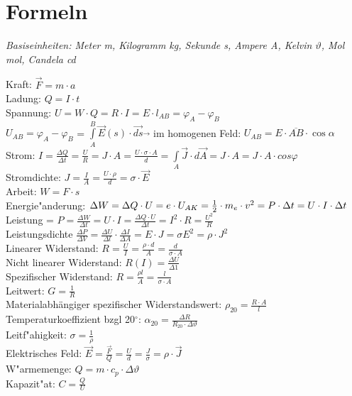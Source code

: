 \section{Formeln}

\textit{Basiseinheiten: Meter m, Kilogramm kg, Sekunde s, Ampere A, Kelvin $\vartheta$, Mol mol, Candela cd} \\
\begin{minipage}{12cm}
	Kraft: $\overrightarrow{F} = m \cdot a$ \\ 
	Ladung: $Q = I \cdot t$\\
	Spannung: $U = W \cdot Q = R \cdot I = E \cdot l_{AB} = \varphi_A - \varphi_B$\\
	$ U_{AB} = \varphi_A - \varphi_B $ = $\int\limits_{A}^B \vec E (s) \cdot  \vec{ds} \overrightarrow{}$ im homogenen Feld: $U_{AB} = E \cdot \overline{AB} \cdot \cos\alpha $ \\
	Strom: $I = \frac{\Delta Q}{\Delta t} = \frac{U}{R} = J \cdot A = \frac{U \cdot \sigma \cdot A}{d} = \int\limits_{A} \vec J \cdot d\vec A = J \cdot A = J \cdot A \cdot cos \varphi $\\
	Stromdichte: $J=\frac {I}{A} = \frac{U \cdot \rho}{d} = \sigma \cdot \vec E $\\
	Arbeit: $W = F \cdot s$ \\
	Energie"anderung: $\Delta W = \Delta Q \cdot U = e \cdot U_{AK} = \frac{1}{2} \cdot m_{e}  \cdot v^2 = \\ P \cdot \Delta t = U \cdot I \cdot \Delta t$ \\
	Leistung = $P = \frac{\Delta W}{\Delta t}= U \cdot I = \frac{\Delta Q \cdot U}{\Delta t} = I^2 \cdot R = \frac{U^2}{R} $\hspace{10pt}\\
	Leistungsdichte $\frac{\Delta P}{\Delta V} = \frac{\Delta U }{\Delta l} \cdot \frac{\Delta I}{\Delta A} = E \cdot J = \sigma E^2 = \rho \cdot J^2 $\\
	Linearer Widerstand: $R = \frac{U}{I} = \frac{\rho \cdot d}{A} = \frac{d}{\sigma \cdot A} \; $\\
	Nicht linearer Widerstand: $R(I) = \frac{\Delta U}{\Delta 1}$ \\
	Spezifischer Widerstand: $R = \frac{\rho\mathit{l}}{A}=\frac{\mathit{l}}{\sigma \cdot A}$\\
	Leitwert: $G = \frac{1}{R}$ \\
	Materialabhängiger spezifischer Widerstandswert: $\rho_{20} = \frac{R \cdot A}{l} $\\
	Temperaturkoeffizient bzgl 20$^\circ$: $\alpha_{20}=\frac{\Delta R}{ R_{20} \cdot \Delta \vartheta}$ \\
	Leitf"ahigkeit: $\sigma = \frac{1}{\rho}$ \\
	Elektrisches Feld: $\overrightarrow{E} = \frac{\overrightarrow{F}}{Q} = \frac{U}{d} = \frac{J}{\sigma} = \rho \cdot \vec J $\\
	W"armemenge: $Q = m \cdot c_{p} \cdot \Delta\vartheta$ \\
	Kapazit"at: $C = \frac{Q}{U}$

\end{minipage}
